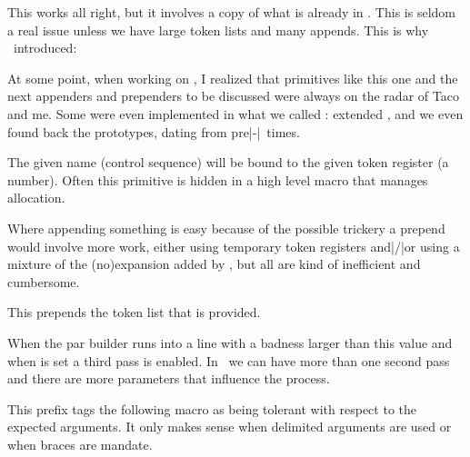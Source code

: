 \starttyping
\scratchtoks\expandafter{\the\scratchtoks more stuff}
\stoptyping

This works all right, but it involves a copy of what is already in \type
{\scratchtoks}. This is seldom a real issue unless we have large token lists and
many appends. This is why \LUATEX\ introduced:

\starttyping
\toksapp{}
\toksapp\scratchtoksone\scratchtokstwo
\stoptyping

At some point, when working on \LUAMETATEX, I realized that primitives like this
one and the next appenders and prependers to be discussed were always on the
radar of Taco and me. Some were even implemented in what we called :
extended \ETEX, and we even found back the prototypes, dating from pre|-|\PDFTEX\
times.

\stopnewprimitive

\startoldprimitive[title={\prm {toksdef}}]

The given name (control sequence) will be bound to the given token register (a
number). Often this primitive is hidden in a high level macro that manages
allocation.

\stopoldprimitive

\startnewprimitive[title={\prm {tokspre}}]

Where appending something is easy because of the possible 
trickery a prepend would involve more work, either using temporary token
registers and|/|or using a mixture of the (no)expansion added by \ETEX, but all
are kind of inefficient and cumbersome.

\starttyping
\tokspre{}
\tokspre\scratchtoksone\scratchtokstwo
\stoptyping

This prepends the token list that is provided.

\stopnewprimitive

\startoldprimitive[title={\prm {tolerance}}]

When the par builder runs into a line with a badness larger than this value and
when \prm {emergencystretch} is set a third pass is enabled. In \LUAMETATEX\ we
can have more than one second pass and there are more parameters that influence
the process.

\stopoldprimitive

\startnewprimitive[title={\prm {tolerant}}]

This prefix tags the following macro as being tolerant with respect to the
expected arguments. It only makes sense when delimited arguments are used or when
braces are mandate.

